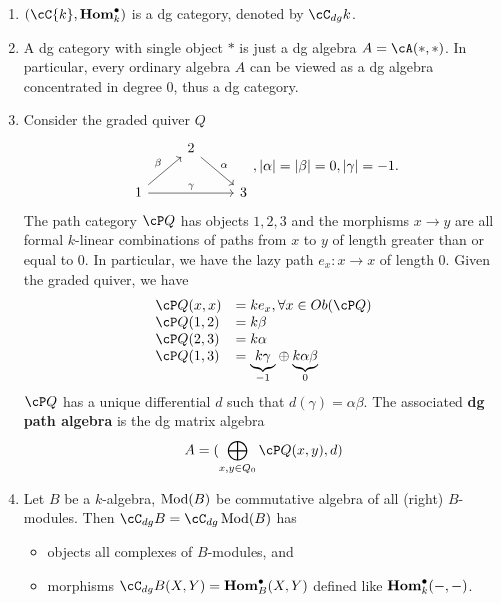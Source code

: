 \begin{eg}
\begin{enumerate}
    \item $ (\cC{k}, \iHom_{k}) $ is a dg category, denoted by $ \cC_{dg}k $.
    \item A dg category with single object $ \ast $ is just a dg algebra $ A = \cA(\ast,\ast) $. In particular, every ordinary algebra $ A $ can be viewed as a dg algebra concentrated in degree 0, thus a dg category. 
    \item Consider the graded quiver $ Q $
    \[ \begin{tikzcd}\label{quiver}
    & 2 \ar[dr,"\alpha"] & \\
    1 \ar[ur,"\beta"]\ar[rr,"\gamma"] &  & 3
    \end{tikzcd}, |\alpha| = |\beta| = 0, |\gamma| = -1. \]
    The path category $ \cP Q $ has objects $ 1,2,3 $ and the morphisms $ x \to y $ are all formal $ k $-linear combinations of paths from $ x $ to $ y $ of length greater than or equal to $ 0 $. 
    In particular, we have the lazy path $ e_{x}:x \to x $ of length $ 0 $. 
    Given the graded quiver, we have
    \[\begin{array}{ll}
        \cP Q(x,x) & = ke_{x}, \forall x\in Ob(\cP Q)  \\
        \cP Q(1,2) & = k\beta \\
        \cP Q(2,3) & = k\alpha \\
        \cP Q(1,3) & = \underset{-1}{\underbrace{k\gamma}} \oplus \underset{0}{\underbrace{k\alpha\beta}}
    \end{array}\]
    $ \cP Q $ has a unique differential $ d $ such that $ d(\gamma) = \alpha\beta $. 
    The associated {\bf dg path algebra} is the dg matrix algebra 
    \[ A = (\bigoplus_{x,y\in Q_{0}} \cP Q(x,y),d) \] 
    \item Let $ B $ be a $ k $-algebra, $ \operatorname{Mod}(B) $ be commutative algebra of all (right) $ B $-modules. Then $ \cC_{dg}B = \cC_{dg}\Mod(B) $ has 
    \begin{itemize}
        \item objects all complexes of $ B $-modules, and 
        \item morphisms $ \cC_{dg}B(X,Y) = \iHom_{B}(X,Y) $ defined like $ \mathbf{Hom}^{\bullet}_{k}(-,-) $. 
    \end{itemize}
\end{enumerate}
\end{eg}

